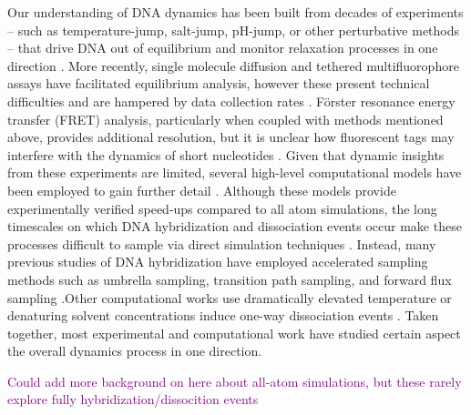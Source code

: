\documentclass[journal=jpcbfk,manuscript=article]{achemso}
\begin{document}
Our understanding of DNA dynamics has been built from decades of experiments -- such as temperature-jump, salt-jump, pH-jump, or other perturbative methods -- that drive DNA out of equilibrium and monitor relaxation processes in one direction \citep{Morrison1993SensitiveSolution, Wetmur1968KineticsDNA, Craig1971ElaxationOligon, Porschke1973ThermodynamicsPairs, Williams1989LaserDGCATGC, Narayanan2012ExploringMixing, Chen2007InfluenceHybridization, Sanstead2018DirectDehybridization}. More recently, single molecule diffusion and tethered multifluorophore assays have facilitated equilibrium analysis, however these present technical difficulties and are hampered by data collection rates \citep{Liu20173DSolution,  Schickinger2018TetheredHelices, Chen2008Base-by-baseSpectroscopy, Dupuis2013Single-moleculeHelices}. Förster resonance energy transfer (FRET) analysis, particularly when coupled with methods mentioned above, provides additional resolution, but it is unclear how fluorescent tags may interfere with the dynamics of short nucleotides \citep{Morrison1993SensitiveSolution}. Given that dynamic insights from these experiments are limited, several high-level computational models have been employed to gain further detail \citep{Romano2013DNADependence, Hinckley2013AnHybridization, Maciejczyk2014DNAModel, Markegard2015}. Although these models provide experimentally verified speed-ups compared to all atom simulations, the long timescales on which DNA hybridization and dissociation events occur make these processes difficult to sample via direct simulation techniques \citep{Phys2014}. Instead, many previous studies of DNA hybridization have employed accelerated sampling methods such as umbrella sampling,  transition path sampling, and forward flux sampling \citep{Schmitt2013ExploringSurface, Sambriski2009,  Hoefert2011MolecularOligonucleotides, Romano2013DNADependence}.Other computational works use dramatically elevated temperature or denaturing solvent concentrations induce one-way dissociation events \citep{Wong2008TheSimulations, Perez2010Real-timeUnfolding}. Taken together, most experimental and computational work have studied certain aspect the overall dynamics process in one direction.


\textcolor{purple}{Could add more background on here about all-atom simulations, but these rarely explore fully hybridization/dissocition events} 
\end{document}
